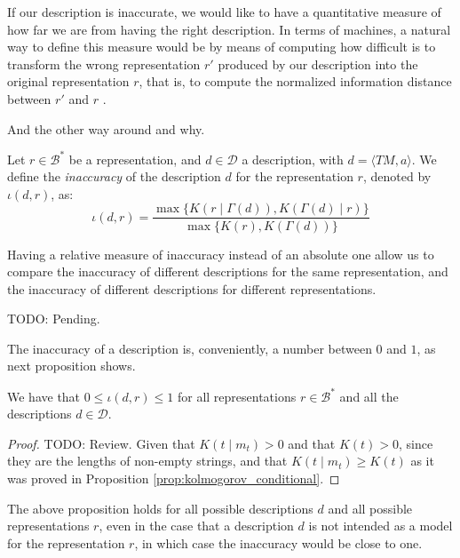 If our description is inaccurate, we would like to have a quantitative measure of how far we are from having the right description. In terms of machines, a natural way to define this measure would be by means of computing how difficult is to transform the wrong representation $r'$ produced by our description into the original representation $r$, that is, to compute the normalized information distance between $r'$ and $r$ .

{\color{red} And the other way around and why}.

\begin{definition} [Inaccuracy]
\label{def:inaccuracy:inaccuracy:inaccuracy}
Let $r \in \mathcal{B}^\ast$ be a representation, and $d \in \mathcal{D}$ a description, with $d = \langle TM, a \rangle$. We define the \emph{inaccuracy} of the description $d$ for the representation $r$, denoted by $\iota(d, r)$, as:
\[
\iota(d, r) = \frac{ \max\{ K \left(r \mid \Gamma(d) \right), K \left( \Gamma(d) \mid r \right) \} } { \max\{ K(r), K \left(\Gamma(d) \right) \} }
\]
\end{definition}

Having a relative measure of inaccuracy instead of an absolute one allow us to compare the inaccuracy of different descriptions for the same representation, and the inaccuracy of different descriptions for different representations.

\begin{example}
{\color{red} TODO: Pending.}
\end{example}

The inaccuracy of a description is, conveniently, a number between $0$ and $1$, as next proposition shows.

\begin{proposition}
\label{prop:inaccuracy:inaccuracy:range}
We have that $0 \leq \iota(d, r) \leq 1$ for all representations $r \in \mathcal{B}^\ast$ and all the descriptions $d \in \mathcal{D}$.
\end{proposition}
\begin{proof}
{\color{red} TODO: Review.} Given that $K(t \mid m_t)>0$ and that $K(t)>0$, since they are the lengths of non-empty strings, and that $K(t \mid m_t)  \geq K(t)$ as it was proved in Proposition \ref{prop:kolmogorov_conditional}.
\end{proof}

The above proposition holds for all possible descriptions $d$ and all possible representations $r$, even in the case that a description $d$ is not intended as a model for the representation $r$, in which case the inaccuracy would be close to one.

